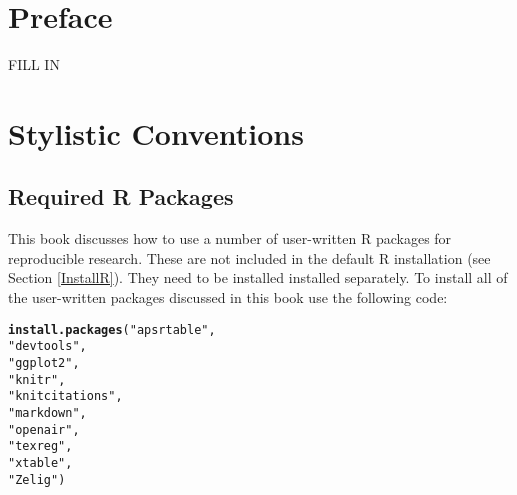 \documentclass[ChapterTOCs,krantz1]{krantz}\usepackage{graphicx, color}
\makeatletter
\newcommand{\hlfunctioncall}[1]{\textcolor[rgb]{0.501960784313725,0,0.329411764705882}{\textbf{#1}}}%
\newcommand{\hlstring}[1]{\textcolor[rgb]{0.6,0.6,1}{#1}}%
\newenvironment{kframe}{%
 \def\at@end@of@kframe{}%
 \ifinner\ifhmode%
  \def\at@end@of@kframe{\end{minipage}}%
  \begin{minipage}{\columnwidth}%
 \fi\fi%
 \def\FrameCommand##1{\hskip\@totalleftmargin \hskip-\fboxsep
 \colorbox{shadecolor}{##1}\hskip-\fboxsep
     \hskip-\linewidth \hskip-\@totalleftmargin \hskip\columnwidth}%
 \MakeFramed {\advance\hsize-\width
   \@totalleftmargin\z@ \linewidth\hsize
   \@setminipage}}%
 {\par\unskip\endMakeFramed%
 \at@end@of@kframe}
\newenvironment{knitrout}{}{} %
\makeatother
\begin{document}
\chapter*{Preface}

FILL IN


\chapter*{Stylistic Conventions}\label{StylisticConventions}
\begin{noindent}









\chapter*{Required R Packages}\label{ReqPackages}

This book discusses how to use a number of user-written R packages for reproducible research. These are not included in the default R installation (see Section \ref{InstallR}). They need to be installed installed separately. To install all of the user-written packages discussed in this book use the following code:

\begin{knitrout}
\color{fgcolor}\begin{kframe}
\begin{alltt}
\hlfunctioncall{install.packages}(\hlstring{"apsrtable"}, 
                \hlstring{"devtools"}, 
                \hlstring{"ggplot2"}, 
                \hlstring{"knitr"}, 
                \hlstring{"knitcitations"}, 
                \hlstring{"markdown"}, 
                \hlstring{"openair"}, 
                \hlstring{"texreg"},                     
                \hlstring{"xtable"}, 
                \hlstring{"Zelig"})
\end{alltt}
\end{kframe}
\end{knitrout}






\end{noindent}

\listoffigures
\listoftables
\tableofcontents

\mainmatter

\setcounter{page}{1}
\end{document}

